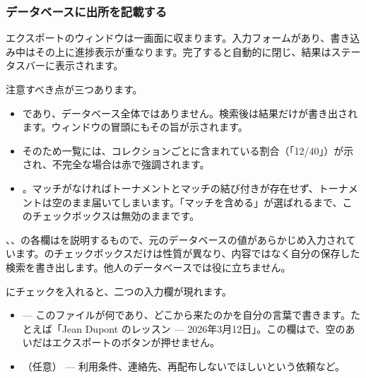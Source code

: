 \documentclass[letterpaper,10pt,dvipdfmx]{sphinxmanual}
\begin{document}
\subsubsection{データベースに出所を記載する}
\label{\detokenize{manuel:marquer-une-base-de-son-origine}}
\sphinxAtStartPar
エクスポートのウィンドウは一画面に収まります。入力フォームがあり、書き込み中はその上に進捗表示が重なります。完了すると自動的に閉じ、結果はステータスバーに表示されます。

\sphinxAtStartPar
注意すべき点が三つあります。
\begin{itemize}
\item {} 
\sphinxAtStartPar
{}であり、データベース全体ではありません。検索後は結果だけが書き出されます。ウィンドウの冒頭にもその旨が示されます。

\item {} 
\sphinxAtStartPar
{}そのため一覧には、コレクションごとに含まれている割合（「12/40」）が示され、不完全な場合は赤で強調されます。

\item {} 
\sphinxAtStartPar
{}。マッチがなければトーナメントとマッチの結び付きが存在せず、トーナメントは空のまま届いてしまいます。「マッチを含める」が選ばれるまで、このチェックボックスは無効のままです。

\end{itemize}

\sphinxAtStartPar
{}、、の各欄はを説明するもので、元のデータベースの値があらかじめ入力されています。のチェックボックスだけは性質が異なり、内容ではなく自分の保存した検索を書き出します。他人のデータベースでは役に立ちません。

\sphinxAtStartPar
{}にチェックを入れると、二つの入力欄が現れます。
\begin{itemize}
\item {} 
\sphinxAtStartPar
{} — このファイルが何であり、どこから来たのかを自分の言葉で書きます。たとえば「Jean Dupont のレッスン — 2026年3月12日」。この欄はで、空のあいだはエクスポートのボタンが押せません。

\item {} 
\sphinxAtStartPar
{}（任意） — 利用条件、連絡先、再配布しないでほしいという依頼など。

\end{itemize}
\end{document}
